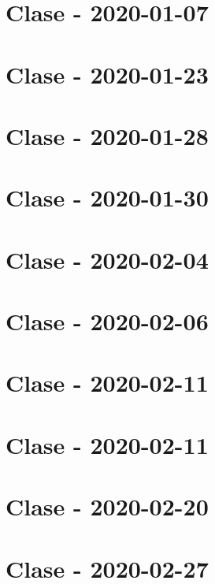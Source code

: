 \documentclass{book}
\begin{document}
\maketitle
\tableofcontents

\tikzblockdefinitions

\chapter{Clase - 2020-01-07}


\chapter{Clase - 2020-01-23}


\chapter{Clase - 2020-01-28}


\chapter{Clase - 2020-01-30}


\chapter{Clase - 2020-02-04}


\chapter{Clase - 2020-02-06}


\chapter{Clase - 2020-02-11}


\chapter{Clase - 2020-02-11}


\chapter{Clase - 2020-02-20}


\chapter{Clase - 2020-02-27}

\end{document}
